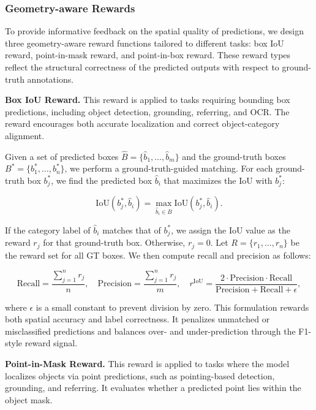 \subsubsection{Geometry-aware Rewards}

To provide informative feedback on the spatial quality of predictions, we design three geometry-aware reward functions tailored to different tasks: box IoU reward, point-in-mask reward, and point-in-box reward. These reward types reflect the structural correctness of the predicted outputs with respect to ground-truth annotations.

\textbf{Box IoU Reward.} This reward is applied to tasks requiring bounding box predictions, including object detection, grounding, referring, and OCR. The reward encourages both accurate localization and correct object-category alignment.

\noindent Given a set of predicted boxes $\hat{B} = \{\hat{b}_1, \dots, \hat{b}_m\}$ and the ground-truth boxes $B^* = \{b^*_1, \dots, b^*_n\}$, we perform a ground-truth-guided matching. For each ground-truth box $b^*_j$, we find the predicted box $\hat{b}_i$ that maximizes the IoU with $b^*_j$:

\begin{equation}
\text{IoU}(b^*_j, \hat{b}_i) = \max_{\hat{b}_i \in \hat{B}} \text{IoU}(b^*_j, \hat{b}_i).
\end{equation}

\noindent If the category label of $\hat{b}_i$ matches that of $b^*_j$, we assign the IoU value as the reward $r_j$ for that ground-truth box. Otherwise, $r_j = 0$. Let $R = \{r_1, \dots, r_n\}$ be the reward set for all GT boxes. We then compute recall and precision as follows:

\begin{equation}
\text{Recall} = \frac{\sum_{j=1}^{n} r_j}{n}, \quad
\text{Precision} = \frac{\sum_{j=1}^{n} r_j}{m}, \quad
r^{\text{IoU}} = \frac{2 \cdot \text{Precision} \cdot \text{Recall}}{\text{Precision} + \text{Recall} + \epsilon},
\end{equation}

\noindent where $\epsilon$ is a small constant to prevent division by zero. This formulation rewards both spatial accuracy and label correctness. It penalizes unmatched or misclassified predictions and balances over- and under-prediction through the F1-style reward signal.

\textbf{Point-in-Mask Reward.} This reward is applied to tasks where the model localizes objects via point predictions, such as pointing-based detection, grounding, and referring. It evaluates whether a predicted point lies within the object mask.

